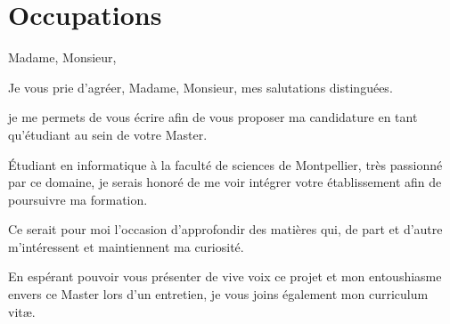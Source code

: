 \documentclass[11pt,a4paper,sans]{moderncv}        %
\begin{document}
\section{Occupations}

\nocite{*}



\clearpage
\date{9 février 2017}
\opening{Madame, Monsieur,}
\closing{Je vous prie d'agréer, Madame, Monsieur, mes salutations distinguées.}
\makelettertitle


je me permets de vous écrire afin de vous proposer ma candidature en tant qu’étudiant au sein de
votre Master.

Étudiant en informatique à la faculté de sciences de Montpellier, très passionné par ce domaine, je serais honoré de me voir intégrer votre établissement afin de poursuivre ma formation.

Ce serait pour moi l’occasion d’approfondir des matières qui, de part et d’autre m’intéressent et maintiennent ma curiosité.

En espérant pouvoir vous présenter de vive voix ce projet et mon entoushiasme envers ce Master lors d’un entretien, je vous joins également mon curriculum vitæ.


\makeletterclosing

\end{document}
